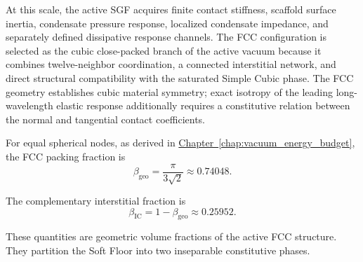 At this scale, the active SGF acquires finite contact stiffness, scaffold surface inertia, condensate pressure response, localized condensate impedance, and separately defined dissipative response channels. The FCC configuration is selected as the cubic close-packed branch of the active vacuum because it combines twelve-neighbor coordination, a connected interstitial network, and direct structural compatibility with the saturated Simple Cubic phase. The FCC geometry establishes cubic material symmetry; exact isotropy of the leading long-wavelength elastic response additionally requires a constitutive relation between the normal and tangential contact coefficients.

For equal spherical nodes, as derived in \hyperref[chap:vacuum_energy_budget]{Chapter~\ref*{chap:vacuum_energy_budget}}, the FCC packing fraction is
\begin{equation}
    \beta_{\mathrm{geo}} = \frac{\pi}{3\sqrt{2}} \approx 0.74048.
    \label{eq:sec34_fcc_packing_fraction}
\end{equation}

The complementary interstitial fraction is
\begin{equation}
    \beta_{\mathrm{IC}} = 1 - \beta_{\mathrm{geo}} \approx 0.25952.
    \label{eq:sec34_interstitial_fraction}
\end{equation}

These quantities are geometric volume fractions of the active FCC structure. They partition the Soft Floor into two inseparable constitutive phases.

